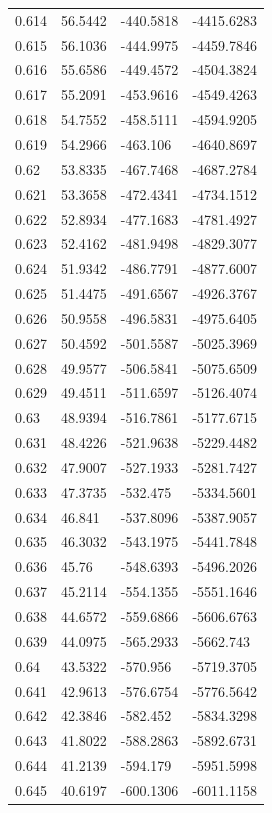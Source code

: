 \begin{tabular}{llll}
0.614 & 56.5442 & -440.5818 & -4415.6283 \\
0.615 & 56.1036 & -444.9975 & -4459.7846 \\
0.616 & 55.6586 & -449.4572 & -4504.3824 \\
0.617 & 55.2091 & -453.9616 & -4549.4263 \\
0.618 & 54.7552 & -458.5111 & -4594.9205 \\
0.619 & 54.2966 & -463.106 & -4640.8697 \\
0.62 & 53.8335 & -467.7468 & -4687.2784 \\
0.621 & 53.3658 & -472.4341 & -4734.1512 \\
0.622 & 52.8934 & -477.1683 & -4781.4927 \\
0.623 & 52.4162 & -481.9498 & -4829.3077 \\
0.624 & 51.9342 & -486.7791 & -4877.6007 \\
0.625 & 51.4475 & -491.6567 & -4926.3767 \\
0.626 & 50.9558 & -496.5831 & -4975.6405 \\
0.627 & 50.4592 & -501.5587 & -5025.3969 \\
0.628 & 49.9577 & -506.5841 & -5075.6509 \\
0.629 & 49.4511 & -511.6597 & -5126.4074 \\
0.63 & 48.9394 & -516.7861 & -5177.6715 \\
0.631 & 48.4226 & -521.9638 & -5229.4482 \\
0.632 & 47.9007 & -527.1933 & -5281.7427 \\
0.633 & 47.3735 & -532.475 & -5334.5601 \\
0.634 & 46.841 & -537.8096 & -5387.9057 \\
0.635 & 46.3032 & -543.1975 & -5441.7848 \\
0.636 & 45.76 & -548.6393 & -5496.2026 \\
0.637 & 45.2114 & -554.1355 & -5551.1646 \\
0.638 & 44.6572 & -559.6866 & -5606.6763 \\
0.639 & 44.0975 & -565.2933 & -5662.743 \\
0.64 & 43.5322 & -570.956 & -5719.3705 \\
0.641 & 42.9613 & -576.6754 & -5776.5642 \\
0.642 & 42.3846 & -582.452 & -5834.3298 \\
0.643 & 41.8022 & -588.2863 & -5892.6731 \\
0.644 & 41.2139 & -594.179 & -5951.5998 \\
0.645 & 40.6197 & -600.1306 & -6011.1158 \\

\end{tabular}
